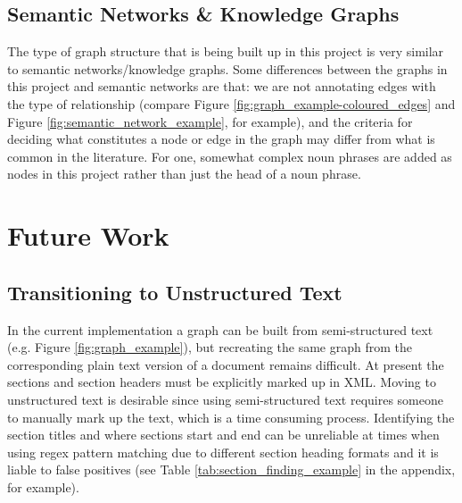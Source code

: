 \documentclass[12pt]{article}
\theoremstyle{grammarstyle}
\begin{document}
\subsection{Semantic Networks \& Knowledge Graphs}
The type of graph structure that is being built up in this project is very similar to semantic networks/knowledge graphs. Some differences between the graphs in this project and semantic networks are that: we are not annotating edges with the type of relationship (compare Figure \ref{fig:graph_example-coloured_edges} and Figure \ref{fig:semantic_network_example}, for example), and the criteria for deciding what constitutes a node or edge in the graph may differ from what is common in the literature. For one, somewhat complex noun phrases are added as nodes in this project rather than just the head of a noun phrase.


\section{Future Work} \label{sec:future_work}
\subsection{Transitioning to Unstructured Text}
In the current implementation a graph can be built from semi-structured text (e.g. Figure \ref{fig:graph_example}), but recreating the same graph from the corresponding plain text version of a document remains difficult. At present the sections and section headers must be explicitly marked up in XML. Moving to unstructured text is desirable since using semi-structured text requires someone to manually mark up the text, which is a time consuming process. Identifying the section titles and where sections start and end can be unreliable at times when using regex pattern matching due to different section heading formats and it is liable to false positives (see Table \ref{tab:section_finding_example} in the appendix, for example). 
\end{document}
